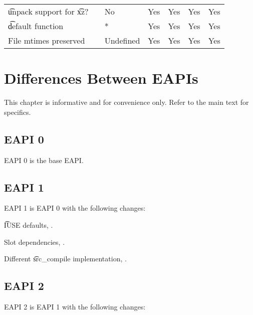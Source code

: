 \begin{landscape}
\begin{longtable}{llP{7.5em}P{7.5em}P{7.5em}P{7.5em}P{7.5em}}
\t{unpack} support for \t{xz}? &  &
    No & Yes & Yes & Yes & Yes \\

\t{default} function &  &
    * & Yes & Yes & Yes & Yes \\

File mtimes preserved &  &
    Undefined & Yes & Yes & Yes & Yes \\

\end{longtable}
\end{landscape}

\chapter{Differences Between EAPIs}

\note This chapter is informative and for convenience only. Refer to the main text for specifics.

\section*{EAPI 0}

EAPI 0 is the base EAPI.

\section*{EAPI 1}

EAPI 1 is EAPI 0 with the following changes:

\begin{compactitem}
\item \t{IUSE} defaults, .
\item Slot dependencies, .
\item Different \t{src\_compile} implementation, .
\end{compactitem}

\section*{EAPI 2}

EAPI 2 is EAPI 1 with the following changes:

